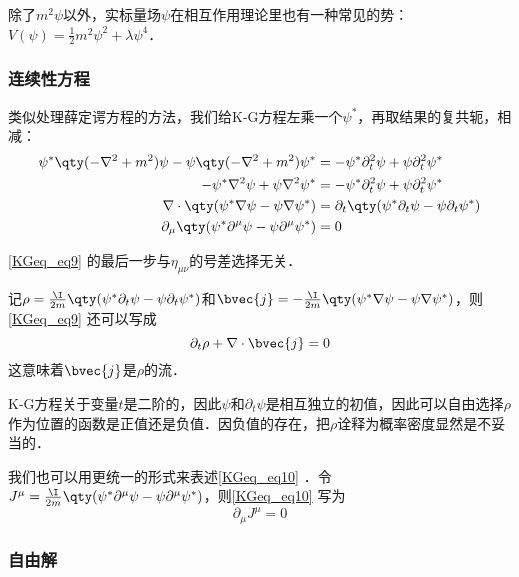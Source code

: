 除了$m^2\psi$以外，实标量场$\psi$在相互作用理论里也有一种常见的势：$V(\psi)=\frac{1}{2}m^2\psi^2+\lambda\psi^4$．





\subsubsection{连续性方程}

类似处理薛定谔方程的方法，我们给K-G方程左乘一个$\psi^*$，再取结果的复共轭，相减：
\begin{equation}\label{KGeq_eq9}
\begin{aligned}
\psi^*\qty(-\nabla^2+m^2)\psi-\psi\qty(-\nabla^2+m^2)\psi^* &= -\psi^*\partial_t^2 \psi+\psi\partial_t^2 \psi^*\\
-\psi^*\nabla^2\psi+\psi\nabla^2\psi^* &= -\psi^*\partial_t^2\psi+\psi\partial_t^2\psi^*\\
\nabla\cdot\qty(\psi^*\nabla\psi-\psi\nabla\psi^*) &= \partial_t\qty(\psi^*\partial_t\psi-\psi\partial_t\psi^*)\\
\partial_\mu\qty(\psi^*\partial^\mu\psi-\psi\partial^\mu\psi^*) & =0
\end{aligned}
\end{equation}

\autoref{KGeq_eq9} 的最后一步与$\eta_{\mu\nu}$的号差选择无关．

记$\rho=\frac{\I}{2m}\qty(\psi^*\partial_t\psi-\psi\partial_t\psi^*)$和$\bvec{j}=-\frac{\I}{2m}\qty(\psi^*\nabla\psi-\psi\nabla\psi^*)$，则\autoref{KGeq_eq9} 还可以写成
\begin{equation}\label{KGeq_eq10}
\partial_t\rho+\nabla\cdot\bvec{j} = 0
\end{equation}
这意味着$\bvec{j}$是$\rho$的流．

K-G方程关于变量$t$是二阶的，因此$\psi$和$\partial_t\psi$是相互独立的初值，因此可以自由选择$\rho$作为位置的函数是正值还是负值．因负值的存在，把$\rho$诠释为概率密度显然是不妥当的．

我们也可以用更统一的形式来表述\autoref{KGeq_eq10} ．令$J^\mu=\frac{\I}{2m}\qty(\psi^*\partial^\mu\psi-\psi\partial^\mu\psi^*)$，则\autoref{KGeq_eq10} 写为
\begin{equation}
\partial_\mu J^\mu = 0
\end{equation}



\subsubsection{自由解}

